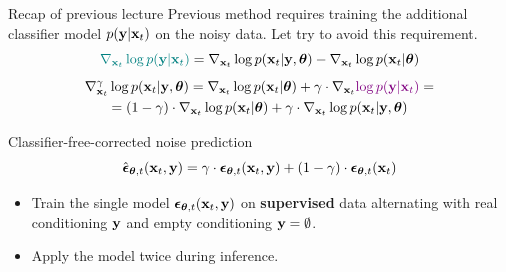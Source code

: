 \begin{frame}{Recap of previous lecture}
	Previous method requires training the additional classifier model $p(\mathbf{y} | \mathbf{x}_t)$ on the noisy data. Let try to avoid this requirement.
	\[
		{\color{teal}\nabla_{\mathbf{x}_t} \log p(\mathbf{y} | \mathbf{x}_t)} =  \nabla_{\mathbf{x}_t} \log p(\mathbf{x}_t| \mathbf{y}, \boldsymbol{\theta}) -\nabla_{\mathbf{x}_t} \log  p(\mathbf{x}_t | \boldsymbol{\theta})
	\]
	\vspace{-0.4cm}
	\begin{multline*}
		\nabla_{\mathbf{x}_t}^{\gamma} \log p(\mathbf{x}_t | \mathbf{y}, \boldsymbol{\theta}) = \nabla_{\mathbf{x}_t} \log p(\mathbf{x}_t | \boldsymbol{\theta}) + \gamma \cdot \nabla_{\mathbf{x}_t} {\color{violet}\log p(\mathbf{y} | \mathbf{x}_t)} = \\
		=  (1 - \gamma) \cdot  \nabla_{\mathbf{x}_t} \log p(\mathbf{x}_t | \boldsymbol{\theta}) + \gamma \cdot  \nabla_{\mathbf{x}_t} \log p(\mathbf{x}_t| \mathbf{y}, \boldsymbol{\theta})
	\end{multline*}
	\vspace{-0.4cm}
	\begin{block}{Classifier-free-corrected noise prediction}
		\vspace{-0.3cm}
		\[
			\hat{\boldsymbol{\epsilon}}_{\boldsymbol{\theta}, t}(\mathbf{x}_t, \mathbf{y}) = \gamma \cdot \boldsymbol{\epsilon}_{\boldsymbol{\theta}, t}(\mathbf{x}_t, \mathbf{y}) + (1 - \gamma) \cdot \boldsymbol{\epsilon}_{\boldsymbol{\theta}, t}(\mathbf{x}_t)
		\]
		\vspace{-0.5cm}
	\end{block}
	\begin{itemize}
		\item Train the single model $\boldsymbol{\epsilon}_{\boldsymbol{\theta}, t}(\mathbf{x}_t, \mathbf{y})$ on \textbf{supervised} data alternating with real conditioning $\mathbf{y}$ and empty conditioning $\mathbf{y} = \emptyset$.
		\item Apply the model twice during inference.
	\end{itemize}
\end{frame}
